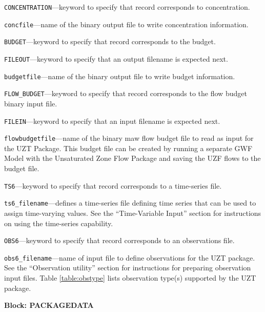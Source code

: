 \begin{description}
\item \texttt{CONCENTRATION}---keyword to specify that record corresponds to concentration.

\item \texttt{concfile}---name of the binary output file to write concentration information.

\item \texttt{BUDGET}---keyword to specify that record corresponds to the budget.

\item \texttt{FILEOUT}---keyword to specify that an output filename is expected next.

\item \texttt{budgetfile}---name of the binary output file to write budget information.

\item \texttt{FLOW\_BUDGET}---keyword to specify that record corresponds to the flow budget binary input file.

\item \texttt{FILEIN}---keyword to specify that an input filename is expected next.

\item \texttt{flowbudgetfile}---name of the binary maw flow budget file to read as input for the UZT Package.  This budget file can be created by running a separate GWF Model with the Unsaturated Zone Flow Package and saving the UZF flows to the budget file.

\item \texttt{TS6}---keyword to specify that record corresponds to a time-series file.

\item \texttt{ts6\_filename}---defines a time-series file defining time series that can be used to assign time-varying values. See the ``Time-Variable Input'' section for instructions on using the time-series capability.

\item \texttt{OBS6}---keyword to specify that record corresponds to an observations file.

\item \texttt{obs6\_filename}---name of input file to define observations for the UZT package. See the ``Observation utility'' section for instructions for preparing observation input files. Table \ref{table:obstype} lists observation type(s) supported by the UZT package.

\end{description}
\item \textbf{Block: PACKAGEDATA}

